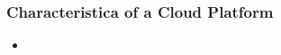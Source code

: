 \documentclass[10pt]{beamer}
\begin{document}
\begin{frame}[t]
\frametitle{Characteristica of a Cloud Platform}

\begin{itemize}
\item 
\end{itemize}



\end{frame}



%    
%    

%     

\end{document}
